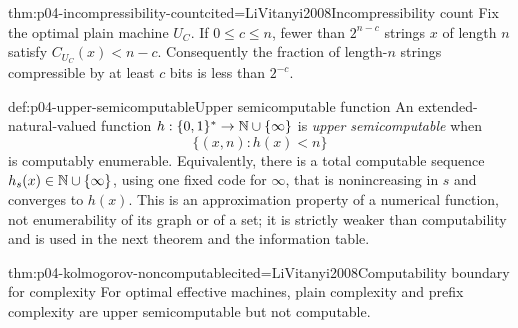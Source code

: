 \begin{hbtheorem}{thm:p04-incompressibility-count}{cited=LiVitanyi2008}{Incompressibility count}
Fix the optimal plain machine \(U_C\).  If \(0\leq c\leq n\), fewer than
\(2^{n-c}\) strings \(x\) of length \(n\) satisfy
\(C_{U_C}(x)<n-c\).  Consequently the fraction of length-\(n\) strings
compressible by at least \(c\) bits is less than \(2^{-c}\).
\end{hbtheorem}

\begin{hbdefinition}{def:p04-upper-semicomputable}{Upper semicomputable function}
An extended-natural-valued function
\(h:\{0,1\}^*\to\mathbb{N}\cup\{\infty\}\) is \emph{upper semicomputable} when
\[
 \{(x,n):h(x)<n\}
\]
is computably enumerable.  Equivalently, there is a total computable sequence
\(h_s(x)\in\mathbb{N}\cup\{\infty\}\), using one fixed code for \(\infty\), that is
nonincreasing in \(s\) and converges to \(h(x)\).  This is an approximation
property of a numerical function, not enumerability of its graph or of a set;
it is strictly weaker than computability and is used in the next theorem and
the information table.
\end{hbdefinition}

\begin{hbtheorem}{thm:p04-kolmogorov-noncomputable}{cited=LiVitanyi2008}{Computability boundary for complexity}
For optimal effective machines, plain complexity and prefix complexity are
upper semicomputable but not computable.
\end{hbtheorem}

